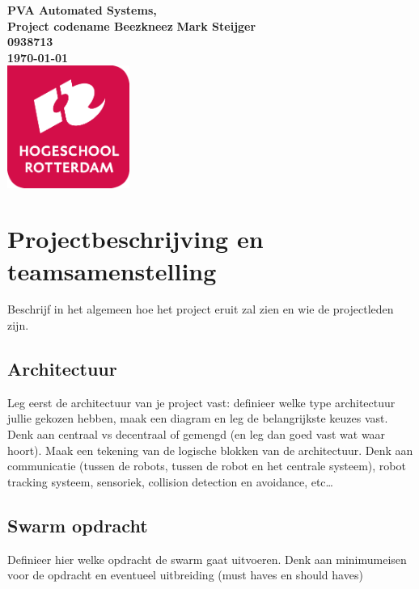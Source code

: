 \documentclass{article}
\begin{document}
\sffamily
\begin{titlepage}
  \centering
    \vfill
    {\bfseries\Huge
      PVA Automated Systems, \\
      Project codename Beezkneez
        \vskip2cm
      }
      {\bfseries\Large
        Mark Steijger\\
      }
      {
        \bfseries\normalsize
        0938713\\
        \vskip1cm
        \today\\
    }    
    \vfill
    \includegraphics[width=4cm]{logohr.png} %
    \vfill
    \vfill
\end{titlepage}
\newpage
\tableofcontents

\newpage

\section{Projectbeschrijving en teamsamenstelling}
Beschrijf in het algemeen hoe het project eruit zal zien en wie de projectleden zijn.  

\subsection{Architectuur}
Leg eerst de architectuur van je project vast: definieer welke type architectuur jullie gekozen hebben, 
maak een diagram en leg de belangrijkste keuzes vast. Denk aan centraal vs decentraal of gemengd (en leg dan goed vast wat waar hoort). 
Maak een tekening van de logische blokken van de architectuur. Denk aan communicatie (tussen de robots, 
tussen de robot en het centrale systeem), robot tracking systeem, sensoriek, collision detection en avoidance, etc… 

\subsection{Swarm opdracht}
Definieer hier welke opdracht de swarm gaat uitvoeren. 
Denk aan minimumeisen voor de opdracht en eventueel uitbreiding (must haves en should haves) 
\end{document}
